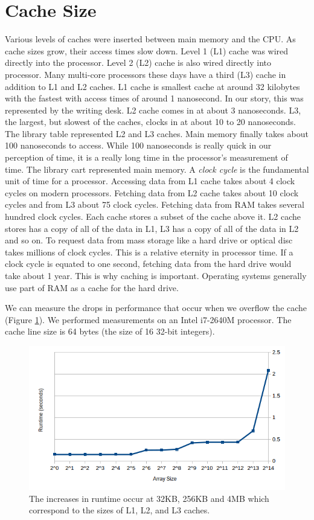 \section*{Cache Size}
Various levels of caches were inserted between main memory and the CPU.
As cache sizes grow, their access times slow down.
Level 1 (L1) cache was wired directly into the processor.  Level 2 (L2) cache is also wired directly into processor.
Many multi-core processors these days have a third (L3) cache in addition to L1 and L2 caches.
L1 cache is smallest cache at around 32 kilobytes with the fastest with access times of around 1 nanosecond.
In our story, this was represented by the writing desk.
L2 cache comes in at about 3 nanoseconds.  L3, the largest, but slowest of the caches, clocks in at about 10 to 20 nanoseconds.
The library table represented L2 and L3 caches.
Main memory finally takes about 100 nanoseconds to access.  While 100 nanoseconds is really quick in our perception of time, it is a really long time in the processor's measurement of time.
The library cart represented main memory.
A \emph{clock cycle} is the fundamental unit of time for a processor.
Accessing data from L1 cache takes about 4 clock cycles on modern processors.  Fetching data from L2 cache takes about 10 clock cycles and from L3 about 75 clock cycles.
Fetching data from RAM takes several hundred clock cycles.
Each cache stores a subset of the cache above it.  L2 cache stores has a copy of all of the data in L1, L3 has a copy of all of the data in L2 and so on.
To request data from mass storage like a hard drive or optical disc takes millions of clock cycles.  This is a relative eternity in processor time.
If a clock cycle is equated to one second, fetching data from the hard drive would take about 1 year.
This is why caching is important.  Operating systems generally use part of RAM as a cache for the hard drive.

We can measure the drops in performance that occur when we overflow the cache (Figure \ref{fig:cachesizes}).
We performed measurements on an Intel i7-2640M processor.  The cache line size is 64 bytes (the size of 16 32-bit integers).
\begin{figure}[h]
\centering
\includegraphics[width=\textwidth]{cache_size.png}
\caption{The increases in runtime occur at 32KB, 256KB and 4MB which correspond to the sizes of L1, L2, and L3 caches.}
\label{fig:cachesizes}
\end{figure}

